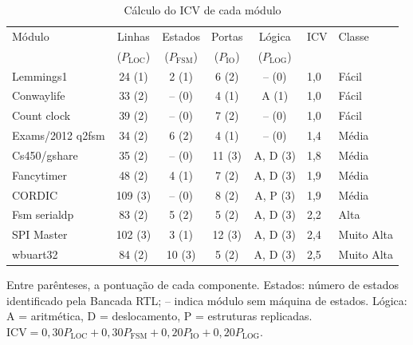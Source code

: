 \begin{table}[htbp]
  \centering
  \caption{Cálculo do ICV de cada módulo}
  \label{tab:ap_icv}
  \footnotesize
  \setlength{\tabcolsep}{4pt}
  \begin{tabular}{@{}lccccll@{}}
    \toprule
    Módulo & Linhas & Estados & Portas & Lógica & ICV & Classe \\
     & ($P_{\mathrm{LOC}}$) & ($P_{\mathrm{FSM}}$) & ($P_{\mathrm{IO}}$) & ($P_{\mathrm{LOG}}$) & & \\
    \midrule
    Lemmings1 & 24 (1) & 2 (1) & 6 (2) & -- (0) & 1,0 & Fácil \\
    Conwaylife & 33 (2) & -- (0) & 4 (1) & A (1) & 1,0 & Fácil \\
    Count clock & 39 (2) & -- (0) & 7 (2) & -- (0) & 1,0 & Fácil \\
    Exams/2012 q2fsm & 34 (2) & 6 (2) & 4 (1) & -- (0) & 1,4 & Média \\
    Cs450/gshare & 35 (2) & -- (0) & 11 (3) & A, D (3) & 1,8 & Média \\
    Fancytimer & 48 (2) & 4 (1) & 7 (2) & A, D (3) & 1,9 & Média \\
    CORDIC & 109 (3) & -- (0) & 8 (2) & A, P (3) & 1,9 & Média \\
    Fsm serialdp & 83 (2) & 5 (2) & 5 (2) & A, D (3) & 2,2 & Alta \\
    SPI Master & 102 (3) & 3 (1) & 12 (3) & A, D (3) & 2,4 & Muito Alta \\
    wbuart32 & 84 (2) & 10 (3) & 5 (2) & A, D (3) & 2,5 & Muito Alta \\
    \bottomrule
  \end{tabular}

  \smallskip
  {\footnotesize Entre parênteses, a pontuação de cada componente. Estados: número de estados identificado pela Bancada RTL; -- indica módulo sem máquina de estados. Lógica: A = aritmética, D = deslocamento, P = estruturas replicadas. $\mathrm{ICV} = 0{,}30P_{\mathrm{LOC}} + 0{,}30P_{\mathrm{FSM}} + 0{,}20P_{\mathrm{IO}} + 0{,}20P_{\mathrm{LOG}}$.}
\end{table}

